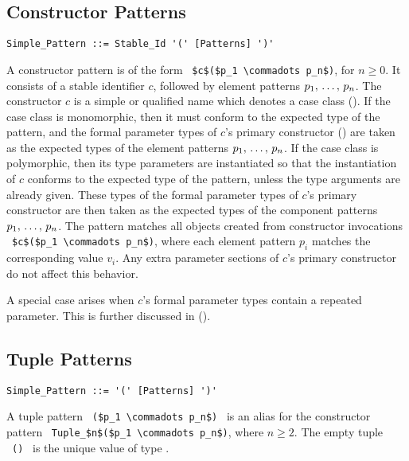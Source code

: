 \subsection{Constructor Patterns}
\label{sec:constructor-patterns}

\syntax\begin{lstlisting}
Simple_Pattern ::= Stable_Id '(' [Patterns] ')'
\end{lstlisting}

A constructor pattern is of the form ~\lstinline!$c$($p_1 \commadots p_n$)!, for $n \geq 0$. It consists of a stable identifier $c$, followed by element patterns $p_1 ,\, \ldots ,\, p_n$. The constructor $c$ is a simple or qualified name which denotes a case class (). If the case class is monomorphic, then it must conform to the expected type of the pattern, and the formal parameter types of $c$'s primary constructor () are taken as the expected types of the element patterns $p_1 ,\, \ldots ,\, p_n$. If the case class is polymorphic, then its type parameters are instantiated so that the instantiation of $c$ conforms to the expected type of the pattern, unless the type arguments are already given. These types of the formal parameter types of $c$'s primary constructor are then taken as the expected types of the component patterns $p_1 ,\, \ldots ,\, p_n$. The pattern matches all objects created from constructor invocations ~\lstinline!$c$($p_1 \commadots p_n$)!, where each element pattern $p_i$ matches the corresponding value $v_i$. Any extra parameter sections of $c$'s primary constructor do not affect this behavior. 

A special case arises when $c$'s formal parameter types contain a repeated parameter. This is further discussed in ().






\subsection{Tuple Patterns}
\label{sec:tuple-patterns}

\syntax\begin{lstlisting}
Simple_Pattern ::= '(' [Patterns] ')'
\end{lstlisting}

A tuple pattern ~\lstinline!($p_1 \commadots p_n$)!~ is an alias for the constructor pattern ~\lstinline!Tuple_$n$($p_1 \commadots p_n$)!, where $n \geq 2$. The empty tuple ~\lstinline!()!~ is the unique value of type . 





